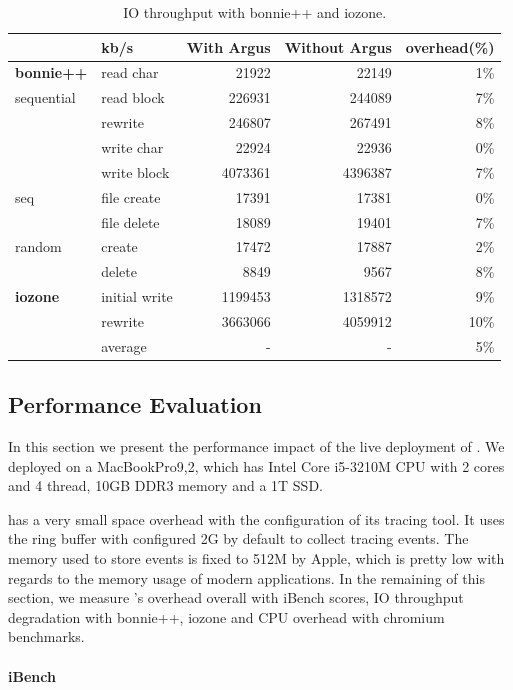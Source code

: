 \begin{table}[tb]
\footnotesize
\centering
\begin{tabular}{ll|rrr}
\hline
 & kb/s & With Argus & Without Argus & overhead(\%)\\
 \hline\hline
\textbf{bonnie++}&read char & 21922 & 22149 & 1\%\\
 sequential& read block & 226931 & 244089 & 7\%\\
 & rewrite & 246807 & 267491 & 8\%\\
 & write char & 22924 & 22936 & 0\%\\
 & write block & 4073361 & 4396387 & 7\%\\
 \hline
 seq& file create & 17391 & 17381 & 0\%\\
 & file delete & 18089 & 19401 & 7\%\\
 \hline
 random& create & 17472 & 17887 & 2\%\\
 & delete & 8849 & 9567 & 8\%\\
 \hline
 \hline
\textbf{iozone} & initial write & 1199453 & 1318572 & 9\%\\
 & rewrite & 3663066 & 4059912 & 10\%\\
 \hline
 & average & - & - & 5\%\\
\hline
\end{tabular}
\caption{IO throughput with bonnie++ and iozone.}
\label{tab:iothroughput}
\end{table}


\subsection{Performance Evaluation}\label{sec:evaluation}

In this section we present the performance impact of the live deployment of
\xxx. We deployed \xxx on a MacBookPro9,2, which has Intel Core i5-3210M CPU with
2 cores and 4 thread, 10GB DDR3 memory and a 1T SSD.

\xxx has a very small space overhead with the configuration of its tracing
tool. It uses the ring buffer with configured 2G by default to collect tracing
events. The memory used to store events is fixed to 512M by Apple, which is pretty
low with regards to the memory usage of modern applications. In the remaining
of this section, we measure \xxx's overhead overall with iBench scores, IO
throughput degradation with bonnie++, iozone and CPU overhead with chromium
benchmarks.

\paragraph{iBench}

